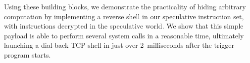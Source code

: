 Using these building blocks, we demonstrate the practicality of hiding arbitrary
computation by implementing a reverse shell in our speculative instruction set,
with instructions decrypted in the speculative world.
We show that this simple payload is able to perform several system calls in a
reasonable time, ultimately launching a dial-back TCP shell in just over
2~milliseconds after the trigger program starts.











